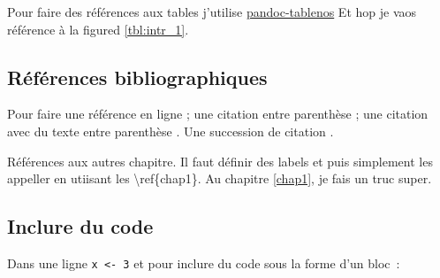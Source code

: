 Pour faire des références aux tables j'utilise
\href{https://github.com/tomduck/pandoc-tablenos}{pandoc-tablenos} Et
hop je vaos référence à la figured \ref{tbl:intr_1}.

\subsection*{Références
bibliographiques}\label{ruxe9fuxe9rences-bibliographiques}

Pour faire une référence en ligne \citet{Cazelles2016a}; une citation
entre parenthèse \citep{Cazelles2016a}; une citation avec du texte entre
parenthèse \citep[voir][]{Cazelles2016a}. Une succession de citation
\citep{Cazelles2016a, MacArthur1967, DeRuiter1995}.

Références aux autres chapitre. Il faut définir des labels et puis
simplement les appeller en utiisant les \textbackslash{}ref\{chap1\}. Au
chapitre \ref{chap1}, je fais un truc super.

\subsection*{Inclure du code}\label{inclure-du-code}

Dans une ligne \texttt{x\ \textless{}-\ 3} et pour inclure du code sous
la forme d'un bloc~:

\begin{Shaded}
\begin{Highlighting}[]
\NormalTok{:}\NormalTok{)\{}
\NormalTok{\}}
\end{Highlighting}
\end{Shaded}

\begin{Shaded}
\begin{Highlighting}[]
      \KeywordTok{;} 
\end{Highlighting}
\end{Shaded}

